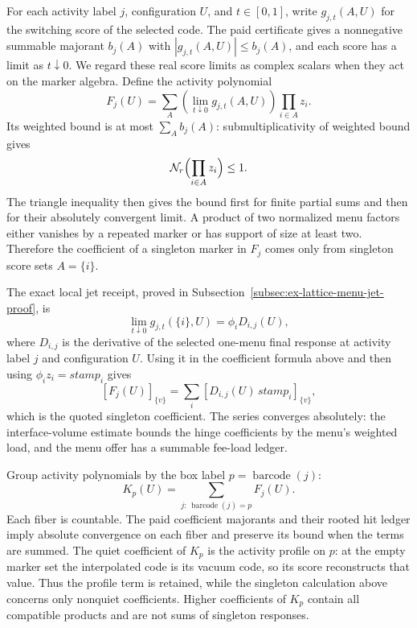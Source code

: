 For each activity label $j$, configuration $U$, and $t\in[0,1]$, write
$g_{j,t}(A,U)$ for the switching score of the selected code. The paid
certificate gives a nonnegative summable majorant $b_j(A)$ with
$|g_{j,t}(A,U)|\leq b_j(A)$, and each score has a limit as $t\downarrow0$.
We regard these real score limits as complex scalars when they act on the
marker algebra. Define the activity polynomial
\[
 F_j(U)=\sum_{A}\left(\lim_{t\downarrow0}g_{j,t}(A,U)\right)
                       \prod_{i\in A}z_i.
\]
Its weighted bound is at most $\sum_A b_j(A)$: submultiplicativity of
weighted bound gives
\[
 \mathcal N_r\Bigl(\prod_{i\in A}z_i\Bigr)\leq1.
\]
The triangle inequality then gives the bound first for finite partial
sums and then for their absolutely convergent limit. A product of two
normalized menu factors either vanishes by a repeated marker or has support
of size at least two. Therefore the coefficient of a singleton marker in
$F_j$ comes only from singleton score sets $A=\{i\}$.

The exact local jet receipt, proved in
Subsection~\ref{subsec:ex-lattice-menu-jet-proof}, is
\begin{equation}
 \lim_{t\downarrow0}g_{j,t}(\{i\},U)
       =\phi_i D_{i,j}(U),
 \label{eq:ex-lattice-menu-jet-input}
\end{equation}
where $D_{i,j}$ is the derivative of the selected one-menu final response
at activity label $j$ and configuration $U$. Using it in the coefficient formula above and
then using $\phi_i z_i=stamp_i$ gives
\[
 [F_j(U)]_{\{v\}}=\sum_i [D_{i,j}(U)\,stamp_i]_{\{v\}},
\]
which is the quoted singleton coefficient. The series converges absolutely:
the interface-volume estimate bounds the hinge coefficients by the menu's
weighted load, and the menu offer has a summable fee-load ledger.

Group activity polynomials by the box label $p=\operatorname{barcode}(j)$:
\[
 K_p(U)=\sum_{j:\,\operatorname{barcode}(j)=p}F_j(U).
\]
Each fiber is countable. The paid coefficient majorants and their rooted
hit ledger imply absolute convergence on each fiber and preserve its bound
when the terms are summed. The quiet coefficient of $K_p$ is the activity
profile on $p$: at the empty marker set the interpolated code is its vacuum
code, so its score reconstructs that value. Thus the profile term is
retained, while the singleton calculation above concerns only nonquiet
coefficients. Higher coefficients of $K_p$ contain all compatible products
and are not sums of singleton responses.

